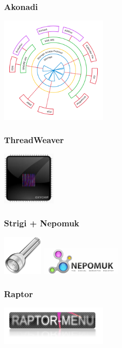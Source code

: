 \documentclass[12pt]{beamer}
\begin{document}
\begin {frame}
\frametitle{Akonadi}
\begin{center}
\includegraphics[height=200px]{imatges/akonadi.png}
\end{center}
\end {frame}

\begin {frame}
\frametitle{ThreadWeaver}
\begin{center}
\includegraphics[width=100px]{imatges/threadweaver.png}
\end{center}
\end {frame}

\begin {frame}
\frametitle{Strigi + Nepomuk}
\begin{center}
\includegraphics[width=75px]{imatges/strigi.png}
\includegraphics[width=150px]{imatges/nepomuk.png}
\end{center}
\end {frame}

\begin {frame}
\frametitle{Raptor}
\begin{center}
\includegraphics[width=200px]{imatges/raptor.png}
\end{center}
\end {frame}
\end{document}
